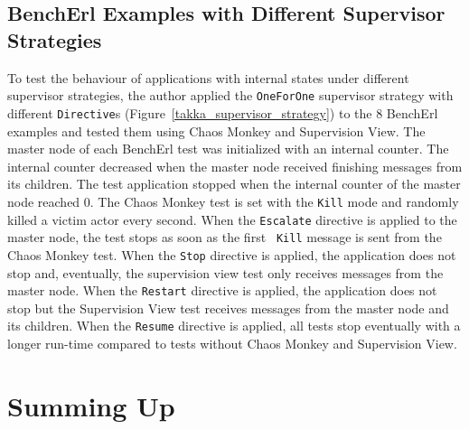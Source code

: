 \subsection{BenchErl Examples with Different Supervisor Strategies}
\label{bencherl_chaos_test}

To test the behaviour of applications with internal states under 
different supervisor strategies, the author applied the {\tt OneForOne} 
supervisor strategy with different {\tt Directive}s (Figure~\ref{takka_supervisor_strategy}) to the 8 BenchErl examples 
and tested them using Chaos Monkey and Supervision View.  The master node of 
each BenchErl test was initialized with an internal counter.  The internal 
counter decreased when the master node received finishing messages from its 
children.  The test application stopped when the internal counter of the master 
node reached 0.  The Chaos Monkey test is set with the {\tt Kill} mode 
and randomly killed a victim actor every second.  When the {\tt Escalate} 
directive is applied to the master node, the test stops as soon as the first {\tt 
Kill} message is sent from the Chaos Monkey test.  When the {\tt Stop} directive 
is applied, the application does not stop and, eventually, the supervision view 
test only receives messages from the master node.  When the {\tt Restart} 
directive is applied, the application does not stop but the Supervision View test 
receives messages from the master node and its children.  When the {\tt Resume} 
directive is applied, all tests stop eventually with a longer run-time compared to 
tests without Chaos Monkey and Supervision View.

\section{Summing Up}


